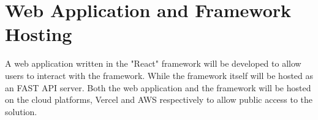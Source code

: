 \section{Web Application and Framework Hosting}
A web application written in the "React" framework will be developed to allow users to interact with the framework. While the framework itself will be hosted as an FAST API server. Both the web application and the framework will be hosted on the cloud platforms, Vercel and AWS respectively to allow public access to the solution.